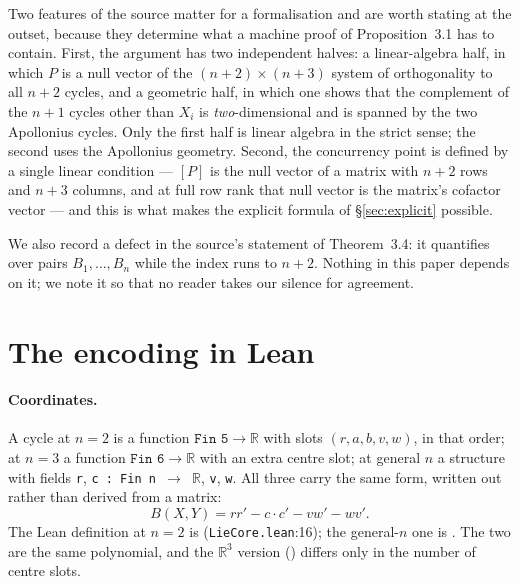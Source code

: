\documentclass[11pt]{article}
\theoremstyle{definition}
\theoremstyle{remark}
\newcommand{\src}[3]{\texttt{#2}:#3}
\newcommand{\RR}{\mathbb{R}}
\begin{document}
Two features of the source matter for a formalisation and are worth stating at the outset, because
they determine what a machine proof of Proposition~3.1 has to contain. First, the argument has two
independent halves: a linear-algebra half, in which $P$ is a null vector of the $(n+2)\times(n+3)$
system of orthogonality to all $n+2$ cycles, and a geometric half, in which one shows that the
complement of the $n+1$ cycles other than $X_i$ is \emph{two}-dimensional and is spanned by the two
Apollonius cycles. Only the first half is linear algebra in the strict sense; the second uses the Apollonius
geometry. Second, the concurrency point is defined by a single linear condition --- $[P]$ is the null
vector of a matrix with $n+2$ rows and $n+3$ columns, and at full row rank that null vector is the
matrix's cofactor vector --- and this is what makes the explicit formula of \S\ref{sec:explicit}
possible.

We also record a defect in the source's statement of Theorem~3.4: it quantifies over pairs
$B_1,\dots,B_n$ while the index runs to $n+2$. Nothing in this paper depends on it; we note it so
that no reader takes our silence for agreement.

\section{The encoding in Lean}\label{sec:encoding}

\paragraph{Coordinates.} A cycle at $n=2$ is a function $\texttt{Fin 5}\to\RR$ with slots
$(r,a,b,v,w)$, in that order; at $n=3$ a function $\texttt{Fin 6}\to\RR$ with an extra centre slot;
at general $n$ a structure  with fields \texttt{r}, \texttt{c : Fin n $\to$ $\RR$},
\texttt{v}, \texttt{w}. All three carry the same form, written out rather than derived from a matrix:
\begin{equation}\label{eq:leanB}
B(X,Y)=rr'-c\cdot c'-vw'-wv' .
\end{equation}
The Lean definition at $n=2$ is  (\src{PaperK}{LieCore.lean}{16}); the general-$n$
one is . The two are the same polynomial, and the $\RR^3$ version
() differs only in the number of centre slots.
\end{document}
